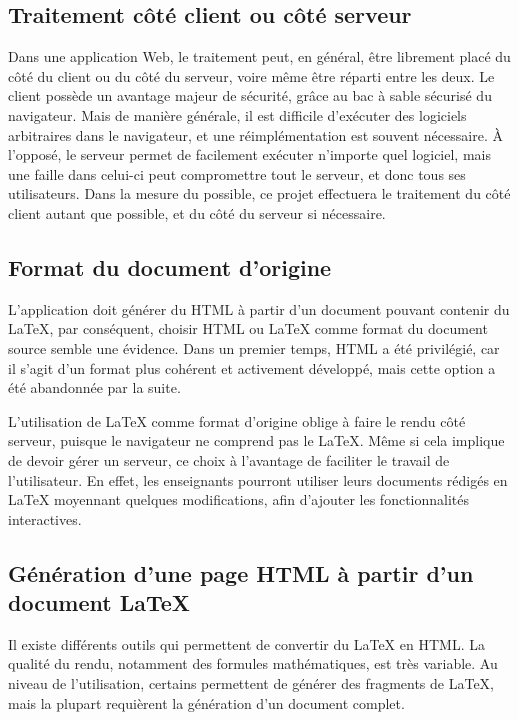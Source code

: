 \documentclass[12pt,titlepage,oneside]{article}
\renewcommand{\footnote}[1]{}
\begin{document}
\subsection{Traitement côté client ou côté serveur}
Dans une application Web, le traitement peut, en général, être librement placé du côté du client ou du côté du serveur, voire même être réparti entre les deux. Le client possède un avantage majeur de sécurité, grâce au bac à sable sécurisé du navigateur. Mais de manière générale, il est difficile d'exécuter des logiciels arbitraires dans le navigateur, et une réimplémentation est souvent nécessaire. À l'opposé, le serveur permet de facilement exécuter n'importe quel logiciel, mais une faille dans celui-ci peut compromettre tout le serveur, et donc tous ses utilisateurs. Dans la mesure du possible, ce projet effectuera le traitement du côté client autant que possible, et du côté du serveur si nécessaire.

\subsection{Format du document d'origine}
L'application doit générer du HTML à partir d'un document pouvant contenir du LaTeX, par conséquent, choisir HTML ou LaTeX comme format du document source semble une évidence. Dans un premier temps, HTML a été privilégié, car il s'agit d'un format plus cohérent et activement développé, mais cette option a été abandonnée par la suite\footnote{voir \nameref{AlternativesConsidérées}}.\par
L'utilisation  de LaTeX comme format d'origine oblige à faire le rendu côté serveur, puisque le navigateur ne comprend pas le LaTeX. Même si cela implique de devoir gérer un serveur, ce choix à l'avantage de faciliter le travail de l'utilisateur. En effet, les enseignants pourront utiliser leurs documents rédigés en LaTeX moyennant quelques modifications, afin d'ajouter les fonctionnalités interactives.

\newpage

\subsection{Génération d'une page HTML à partir d'un document LaTeX}
Il existe différents outils \footnote{voir \nameref{Outils}} qui permettent de convertir du LaTeX en HTML. La qualité du rendu, notamment des formules mathématiques, est très variable. Au niveau de l'utilisation, certains permettent de générer des fragments de LaTeX, mais la plupart requièrent la génération d'un document complet.\par
\end{document}

